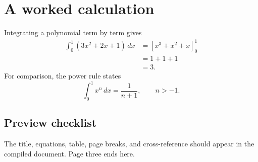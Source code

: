 \documentclass[11pt]{article}
\begin{document}
\newpage
\section{A worked calculation}
Integrating a polynomial term by term gives
\begin{align*}
\int_0^1 (3x^2 + 2x + 1)\,dx
&= \left[x^3 + x^2 + x\right]_0^1 \\
&= 1 + 1 + 1 \\
&= 3.
\end{align*}
For comparison, the power rule states
\[
\int_0^1 x^n\,dx = \frac{1}{n+1}, \qquad n > -1.
\]
\subsection{Preview checklist}
The title, equations, table, page breaks, and cross-reference should appear in
the compiled document.
\vfill
Page three ends here.
\end{document}
